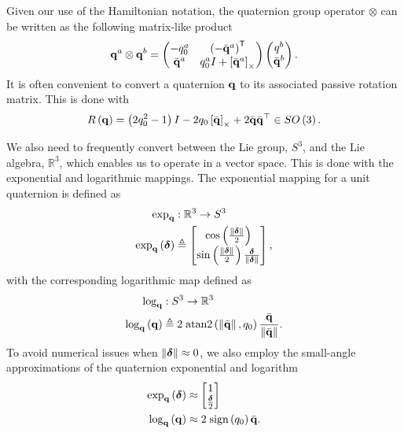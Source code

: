 Given our use of the Hamiltonian notation, the quaternion group operator
$\otimes$ can be written as the following matrix-like product
\begin{equation}
	\boldsymbol{\mathrm{q}}^a \otimes \boldsymbol{\mathrm{q}}^b = \begin{pmatrix} -q_0^a & \left(-\bar{\boldsymbol{\mathrm{q}}}^{a}\right)^{\mathsf{T}} \\ \bar{\boldsymbol{\mathrm{q}}}^a & q^a_0 I + \left[ \bar{\boldsymbol{\mathrm{q}}}^a \right]_{\times} \end{pmatrix}
	\begin{pmatrix} q^b \\ \bar{\boldsymbol{\mathrm{q}}}^b\end{pmatrix}.
\end{equation}
It is often convenient to convert a quaternion $\boldsymbol{\mathrm{q}}$ to its associated passive rotation matrix.  This is done with
\begin{equation}
\label{eq:R_from_q}
R\left(\q\right)=\left(2q_{0}^{2}-1\right)I-2q_{0}\skewmat{\bar{\q}}+2\bar{\q}\bar{\q}^{\top}\in SO\left(3\right).
\end{equation}

We also need to frequently convert between the Lie group, $S^3$, and the Lie
algebra, $\mathbb{R}^3$, which enables us to operate in a vector space. This is done with the
exponential and logarithmic mappings. The exponential mapping for a unit quaternion is defined as
\begin{align}
\exp_{\q} & :\mathbb{R}^{3}\rightarrow S^3\nonumber \\
\exp_{\q}\left(\vect{\delta}\right) & \triangleq\begin{bmatrix}\cos\left(\frac{\lVert\vect{\delta}\rVert}{2}\right)\\
\sin\left(\frac{\lVert\vect{\delta}\rVert}{2}\right)\frac{\vect{\delta}}{\lVert\vect{\delta}\rVert}
\end{bmatrix},\label{eqn:exponential_map}
\end{align}
with the corresponding logarithmic map defined as
\begin{align}
\log_{\q} & :S^3\rightarrow \mathbb{R}^{3}\nonumber \\
\log_{\q}\left(\q\right) & \triangleq2\;\mathrm{atan2}\left(\left\Vert \bar{\q}\right\Vert ,q_{0}\right)\frac{\bar{\q}}{\left\Vert \bar{\q}\right\Vert }.\label{eqn:log_map}
\end{align}
To avoid numerical issues when $\left\Vert \boldsymbol{\mathrm{\delta}}\right\Vert\approx0$, we also employ the small-angle approximations of the quaternion exponential and logarithm
\begin{align}
\exp_{\q}\left(\vect{\delta}\right) & \approx\begin{bmatrix}1\\
\frac{\vect{\delta}}{2}
\end{bmatrix}\label{eq:quaternion_exp_approx}\\
\log_{\q}\left(\q\right) & \approx2\;\textrm{sign}\left(q_{0}\right)\bar{\q}.\label{eq:quaternion_log_approx}
\end{align}

